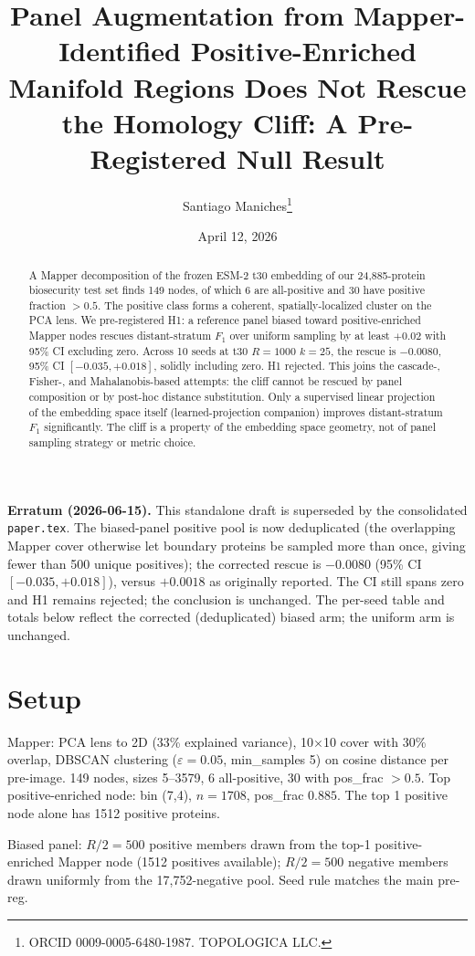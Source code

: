 \documentclass[11pt]{article}
\title{Panel Augmentation from Mapper-Identified Positive-Enriched Manifold Regions Does Not Rescue the Homology Cliff: A Pre-Registered Null Result}
\author{Santiago Maniches\thanks{ORCID 0009-0005-6480-1987. TOPOLOGICA LLC.}}
\date{April 12, 2026}
\begin{document}
\maketitle

\noindent\textbf{Erratum (2026-06-15).} This standalone draft is superseded by the consolidated \texttt{paper.tex}. The biased-panel positive pool is now deduplicated (the overlapping Mapper cover otherwise let boundary proteins be sampled more than once, giving fewer than 500 unique positives); the corrected rescue is $-0.0080$ (95\% CI $[-0.035,+0.018]$), versus $+0.0018$ as originally reported. The CI still spans zero and H1 remains rejected; the conclusion is unchanged. The per-seed table and totals below reflect the corrected (deduplicated) biased arm; the uniform arm is unchanged.
\begin{abstract}
A Mapper decomposition of the frozen ESM-2 t30 embedding of our 24{,}885-protein biosecurity test set finds 149 nodes, of which 6 are all-positive and 30 have positive fraction $>0.5$. The positive class forms a coherent, spatially-localized cluster on the PCA lens. We pre-registered H1: a reference panel biased toward positive-enriched Mapper nodes rescues distant-stratum $F_1$ over uniform sampling by at least $+0.02$ with 95\% CI excluding zero. Across 10 seeds at t30 $R{=}1000$ $k{=}25$, the rescue is $-0.0080$, 95\% CI $[-0.035, +0.018]$, solidly including zero. H1 rejected. This joins the cascade-, Fisher-, and Mahalanobis-based attempts: the cliff cannot be rescued by panel composition or by post-hoc distance substitution. Only a supervised linear projection of the embedding space itself (learned-projection companion) improves distant-stratum $F_1$ significantly. The cliff is a property of the embedding space geometry, not of panel sampling strategy or metric choice.
\end{abstract}

\section{Setup}
Mapper: PCA lens to 2D (33\% explained variance), 10$\times$10 cover with 30\% overlap, DBSCAN clustering ($\varepsilon{=}0.05$, min\_samples 5) on cosine distance per pre-image. 149 nodes, sizes 5--3579, 6 all-positive, 30 with pos\_frac $>0.5$. Top positive-enriched node: bin (7,4), $n{=}1708$, pos\_frac $0.885$. The top 1 positive node alone has 1512 positive proteins.

Biased panel: $R/2 = 500$ positive members drawn from the top-1 positive-enriched Mapper node (1512 positives available); $R/2 = 500$ negative members drawn uniformly from the 17{,}752-negative pool. Seed rule matches the main pre-reg.
\end{document}

